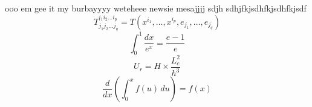 \documentclass[a4paper]{article}
\begin{document}
ooo em gee it my burbayyyy weteheee
newsie mesajjjj
sdjh
sdhjfkjsdhfkjsdhfkjsdf
\[ T^{i_1 i_2 \dots i_p}_{j_1 j_2 \dots j_q} = T(x^{i_1},\dots,x^{i_p},e_{j_1},\dots,e_{j_q}) \]
\[ \int_0^1 \frac{dx}{e^x} =  \frac{e-1}{e} \]
\[ U_r = H \times \frac{L_c^2}{h^3} \]
\[ \frac{d}{dx} \left( \int_{0}^{x} f(u) \, du \right) = f(x) \]
\end{document}
